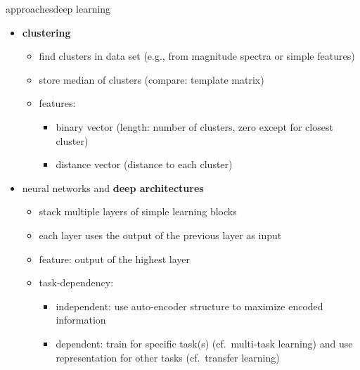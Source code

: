         \begin{frame}{approaches}{deep learning}
            \begin{itemize}
                \item   \textbf{clustering} 
                    \begin{itemize}
                        \item   find clusters in data set (e.g., from magnitude spectra or simple features)
                        \item   store median of clusters (compare: template matrix)
                        \smallskip
                        \item<2->[$\rightarrow$]   features:
                            \begin{itemize}
                                \item   binary vector (length: number of clusters, zero except for closest cluster)
                                \item   distance vector (distance to each cluster)
                            \end{itemize}
                    \end{itemize}
                \bigskip
                \item<3->   neural networks and \textbf{deep architectures} 
                    \begin{itemize}
                        \item   stack multiple layers of simple learning blocks
                        \item   each layer uses the output of the previous layer as input
                        \smallskip
                        \item<4->[$\rightarrow$]   feature: output of the highest layer
                        \item<5->   task-dependency:
                            \begin{itemize}
                                \item   independent: use auto-encoder structure to maximize encoded information
                                \item   dependent: train for specific task(s) (cf.\ multi-task learning) and use representation for other tasks (cf.\ transfer learning)
                            \end{itemize}
                    \end{itemize}
            \end{itemize}
		\end{frame}
                
